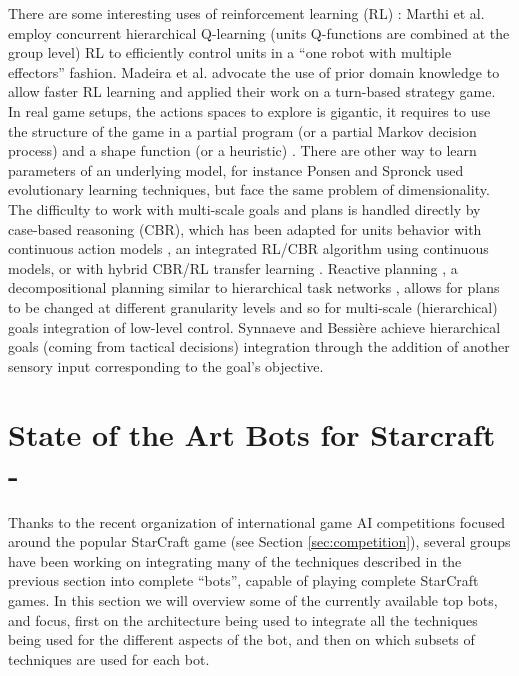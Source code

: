 \documentclass[journal]{IEEEtran}
\begin{document}
There are some interesting uses of reinforcement learning (RL) \cite{Sutton}: Marthi et al. \cite{Marthi05} employ concurrent hierarchical Q-learning (units Q-functions are combined at the group level) RL to efficiently control units in a ``one robot with multiple effectors'' fashion. Madeira et al. \cite{Madeira06} advocate the use of prior domain knowledge to allow faster RL learning and applied their work on a turn-based strategy game. In real game setups, the actions spaces to explore is gigantic, it requires to use the structure of the game in a partial program (or a partial Markov decision process) and a shape function (or a heuristic) \cite{Marthi05}. There are other way to learn parameters of an underlying model, for instance Ponsen and Spronck \cite{GA} used evolutionary learning techniques, but face the same problem of dimensionality. The difficulty to work with multi-scale goals and plans is handled directly by case-based reasoning (CBR), which has been adapted for units behavior with continuous action models \cite{Molineaux08}, an integrated RL/CBR algorithm using continuous models, or with hybrid CBR/RL transfer learning \cite{CBR-RL}. Reactive planning \cite{WeberCig10}, a decompositional planning similar to hierarchical task networks \cite{HTNPlanning}, allows for plans to be changed at different granularity levels and so for multi-scale (hierarchical) goals integration of low-level control. Synnaeve and Bessi\`{e}re \cite{SynnaeveMicroCig11} achieve hierarchical goals (coming from tactical decisions) integration through the addition of another sensory input corresponding to the goal's objective.


\section{State of the Art Bots for Starcraft - \color{blue}{Information/Productions}}\label{sec:bot}

Thanks to the recent organization of international game AI competitions focused around the popular StarCraft game (see Section \ref{sec:competition}), several groups have been working on integrating many of the techniques described in the previous section into complete ``bots'', capable of playing complete StarCraft games. In this section we will overview some of the currently available top bots, and focus, first on the architecture being used to integrate all the techniques being used for the different aspects of the bot, and then on which subsets of techniques are used for each bot.
\end{document}
